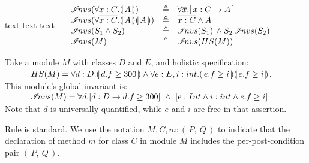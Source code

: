 \label{s:module-proof}


\begin{definition}
text text text 
\label{def:extract}
$
\begin{array}{clcl}
& {\mathcal I}\!nvs( \forall {\overline {x:C}}.{\llparenthesis}\, A \,{\rrparenthesis} )  & \triangleq & \forall \overline{x}.[ \, \overline {x:C} \rightarrow A \, ]
\\
& {\mathcal I}\!nvs( \forall {\overline {x:C}}.{\llparenthesis}\, A \,{\rrparenthesis}{\llparenthesis}\, A \,{\rrparenthesis} )  & \triangleq & \overline {x:C} \wedge A  
\\
& {\mathcal I}\!nvs( S_1 \wedge S_2 ) & \triangleq & {\mathcal I}\!nvs( S_1) \, \wedge S_2 \,  {\mathcal I}\!nvs( S_2 )
\\
&  {\mathcal I}\!nvs( M )  & \triangleq &  {\mathcal I}\!nvs( HS(M) )
\end{array}
$
\end{definition}

 \begin{example}
 \label{example:extract}
  Take a module $M$ with classes $D$ and $E$, and holistic specification:\\
$\strut \ \ \  \ \ \ \ \ \ HS(M)= \forall {d:D}.{\llparenthesis}\, d.f\geq 300 \,{\rrparenthesis} \wedge  \forall {e:E,i:int}.{\llparenthesis}\, e.f\geq i \,{\rrparenthesis}{\llparenthesis}\, e.f\geq i \,{\rrparenthesis} $. 
\\
This module's global invariant is:\\
$\strut \ \ \  \ \ \ \ \ \ {\mathcal I}\!nvs(M)  = \forall d.[d:D \rightarrow d.f\geq 300]\ \wedge \  [ e:Int \wedge i:int \wedge e.f \geq i]$
\\
Note that $d$ is universally quantified, while $e$ and $i$ are free in that assertion.
 \end{example}


Rule {} is standard.  We use  the notation
$ M, C, m  :  (\, P, \ Q\, )  $ to indicate that the declaration of method $m$ for class $C$ in module $M$ includes the per-post-condition pair  $(\, P, \ Q\, ) $. 



